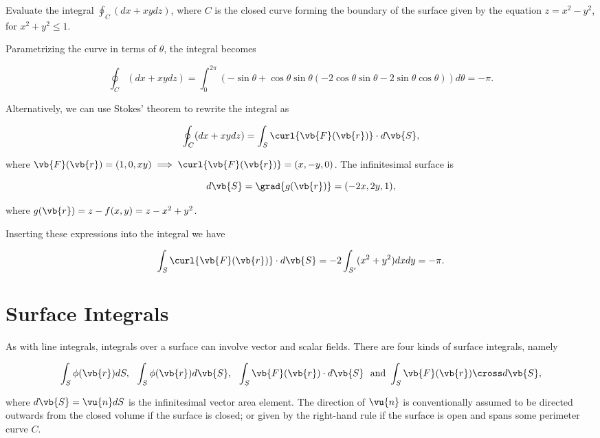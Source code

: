 \documentclass[english,a4paper,12pt]{report}
\begin{document}
{Evaluate the integral \(\oint_{C} (dx + xydz)\), where \(C\) is the closed curve forming the boundary of the surface given by the equation \(z = x^2 - y^2\), for \(x^2 + y^2 \le 1\).}
{Parametrizing the curve in terms of \(\theta \), the integral becomes 

\begin{equation}
	\oint_{C} (dx+xydz) = \int_{0}^{2\pi }(-\sin \theta + \cos \theta \sin \theta  (-2\cos \theta \sin \theta -2\sin \theta \cos \theta ))d \theta = -\pi .  
\end{equation}

Alternatively, we can use Stokes' theorem to rewrite the integral as 

\begin{equation}
	\oint_{C} (dx+xydz) = \int_{S}^{} \curl{\vb{F} (\vb{r} )}\cdot d\vb{S} ,    
\end{equation}

where \(\vb{F} (\vb{r} ) = (1,0,xy) \implies \curl{\vb{F} (\vb{r} )} = (x,-y,0) \). The infinitesimal surface is 

\begin{equation}
	d\vb{S} = \grad{g(\vb{r} )} = (-2x,2y,1), 
\end{equation}

where \(g(\vb{r} ) = z - f(x,y) = z - x^2 + y^2\). 

Inserting these expressions into the integral we have

\begin{equation}
	\int_{S}^{} \curl{\vb{F} (\vb{r} )}\cdot d\vb{S} = -2 \int_{S'}^{} (x^2 + y^2)dxdy  = -\pi .  
\end{equation}

} 




\section{Surface Integrals}
As with line integrals, integrals over a surface can involve vector and scalar fields. There are four kinds of surface integrals, namely 

\begin{equation}
    \int_{S}^{} \phi(\vb{r}) dS,  ~~ \int_{S}^{} \phi(\vb{r}) d\vb{S} , ~~ \int_{S}^{} \vb{F}(\vb{r}) \cdot d\vb{S} ~ \text { and } \int_{S}^{} \vb{F}(\vb{r}) \cross d\vb{S},    
\end{equation}

where \(d\vb{S} = \vu{n} dS\) is the infinitesimal vector area element. The direction of \(\vu{n} \) is conventionally assumed to be directed outwards from the closed volume if the surface is closed; or given by the right-hand rule if the surface is open and spans some perimeter curve \(C\). 
\end{document}
